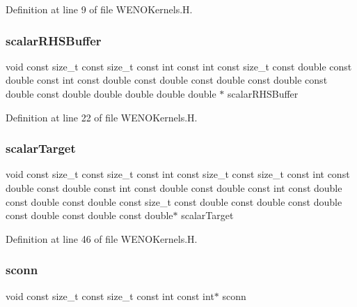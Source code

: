Definition at line 9 of file W\+E\+N\+O\+Kernels.\+H.

\hypertarget{WENOKernels_8H_ade287a7a2e34a50a6f0bfb71f1b7995d}{}\label{WENOKernels_8H_ade287a7a2e34a50a6f0bfb71f1b7995d} 
\subsubsection{\texorpdfstring{scalar\+R\+H\+S\+Buffer}{scalarRHSBuffer}}
{\footnotesize\ttfamily void const size\+\_\+t const size\+\_\+t const int const int const size\+\_\+t const double const double const int const double const double const double const double const double const double double double double double $\ast$ scalar\+R\+H\+S\+Buffer}



Definition at line 22 of file W\+E\+N\+O\+Kernels.\+H.

\hypertarget{WENOKernels_8H_a3680941feb6c14eadd3e8c5eb4c9eee5}{}\label{WENOKernels_8H_a3680941feb6c14eadd3e8c5eb4c9eee5} 
\subsubsection{\texorpdfstring{scalar\+Target}{scalarTarget}}
{\footnotesize\ttfamily void const size\+\_\+t const size\+\_\+t const int const size\+\_\+t const size\+\_\+t const int const double const double const int const double const double const int const double const double const double const size\+\_\+t const double const double const double const double const double const double$\ast$ scalar\+Target}



Definition at line 46 of file W\+E\+N\+O\+Kernels.\+H.

\hypertarget{WENOKernels_8H_a84323f7f31a8db8ca9cb6ffd45f53a8a}{}\label{WENOKernels_8H_a84323f7f31a8db8ca9cb6ffd45f53a8a} 
\subsubsection{\texorpdfstring{sconn}{sconn}}
{\footnotesize\ttfamily void const size\+\_\+t const size\+\_\+t const int const int$\ast$ sconn}



